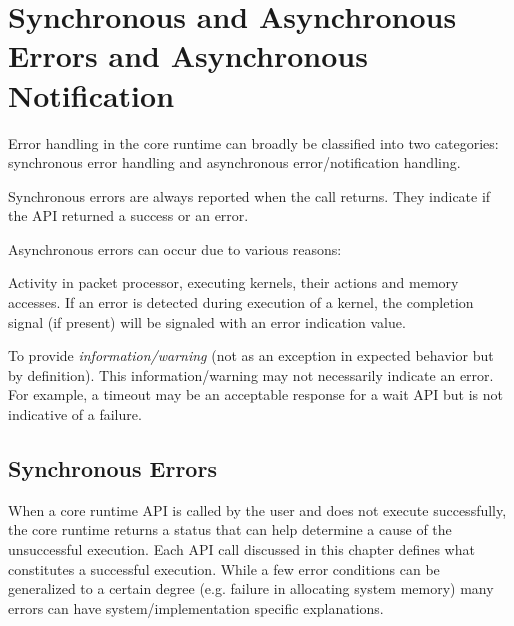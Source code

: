 \documentclass{book}
\newcommand{\emphld}[1]{\begin{DIFnomarkup} \emph{#1}
\end{DIFnomarkup}}
\newenvironment{DIFnomarkup}{}{}
\begin{document}
\begin{DIFnomarkup}
\hypertarget{error}{}\section{Synchronous and Asynchronous Errors and
Asynchronous Notification}
\label{error}
\end{DIFnomarkup}

Error handling in the core runtime can broadly be classified into
two categories: synchronous error handling and asynchronous
error/notification handling.

Synchronous errors are always reported when the call returns. They
indicate if the API returned a success or an error.

Asynchronous errors can occur due to various reasons:
\begin{inparaenum}[(i)]

\item Activity in packet processor, executing kernels, their actions
and memory accesses. If an error is detected during execution of a
kernel, the completion signal (if present) will be signaled with an
error indication value.

\item To provide \emphld{information/warning} (not as an exception
in expected behavior but by definition). This information/warning
may not necessarily indicate an error. For example, a timeout may be
an acceptable response for a wait API but is not indicative of a
failure.

\end{inparaenum}

\begin{DIFnomarkup}
\hypertarget{syncerror}{}\subsection{Synchronous Errors }\label{syncerror}
\end{DIFnomarkup}

When a core runtime API is called by the user and does not execute
successfully, the core runtime returns a status that can help
determine a cause of the unsuccessful execution. Each API call
discussed in this chapter defines what constitutes a successful
execution. While a few error conditions can be generalized to a
certain degree (e.g. failure in allocating system memory) many
errors can have system/implementation specific explanations.
\end{document}
